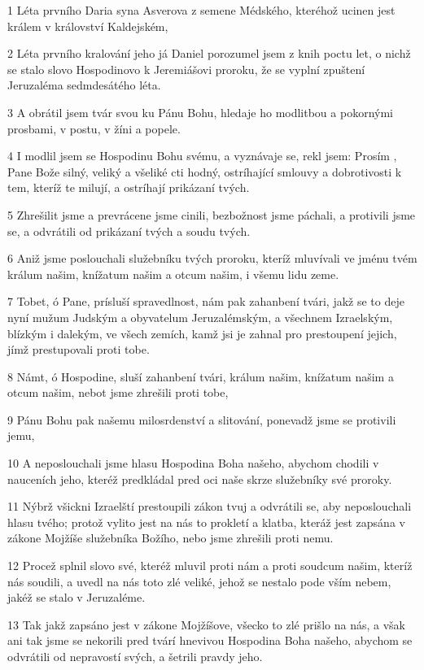 \par 1 Léta prvního Daria syna Asverova z semene Médského, kteréhož ucinen jest králem v království Kaldejském,
\par 2 Léta prvního kralování jeho já Daniel porozumel jsem z knih poctu let, o nichž se stalo slovo Hospodinovo k Jeremiášovi proroku, že se vyplní zpuštení Jeruzaléma sedmdesátého léta.
\par 3 A obrátil jsem tvár svou ku Pánu Bohu, hledaje ho modlitbou a pokornými prosbami, v postu, v žíni a popele.
\par 4 I modlil jsem se Hospodinu Bohu svému, a vyznávaje se, rekl jsem: Prosím , Pane Bože silný, veliký a všeliké cti hodný, ostríhající smlouvy a dobrotivosti k tem, kteríž te milují, a ostríhají prikázaní tvých.
\par 5 Zhrešilit jsme a prevrácene jsme cinili, bezbožnost jsme páchali, a protivili jsme se, a odvrátili od prikázaní tvých a soudu tvých.
\par 6 Aniž jsme poslouchali služebníku tvých proroku, kteríž mluvívali ve jménu tvém králum našim, knížatum našim a otcum našim, i všemu lidu zeme.
\par 7 Tobet, ó Pane, prísluší spravedlnost, nám pak zahanbení tvári, jakž se to deje nyní mužum Judským a obyvatelum Jeruzalémským, a všechnem Izraelským, blízkým i dalekým, ve všech zemích, kamž jsi je zahnal pro prestoupení jejich, jímž prestupovali proti tobe.
\par 8 Námt, ó Hospodine, sluší zahanbení tvári, králum našim, knížatum našim a otcum našim, nebot jsme zhrešili proti tobe,
\par 9 Pánu Bohu pak našemu milosrdenství a slitování, ponevadž jsme se protivili jemu,
\par 10 A neposlouchali jsme hlasu Hospodina Boha našeho, abychom chodili v nauceních jeho, kteréž predkládal pred oci naše skrze služebníky své proroky.
\par 11 Nýbrž všickni Izraelští prestoupili zákon tvuj a odvrátili se, aby neposlouchali hlasu tvého; protož vylito jest na nás to prokletí a klatba, kteráž jest zapsána v zákone Mojžíše služebníka Božího, nebo jsme zhrešili proti nemu.
\par 12 Procež splnil slovo své, kteréž mluvil proti nám a proti soudcum našim, kteríž nás soudili, a uvedl na nás toto zlé veliké, jehož se nestalo pode vším nebem, jakéž se stalo v Jeruzaléme.
\par 13 Tak jakž zapsáno jest v zákone Mojžíšove, všecko to zlé prišlo na nás, a však ani tak jsme se nekorili pred tvárí hnevivou Hospodina Boha našeho, abychom se odvrátili od nepravostí svých, a šetrili pravdy jeho.
